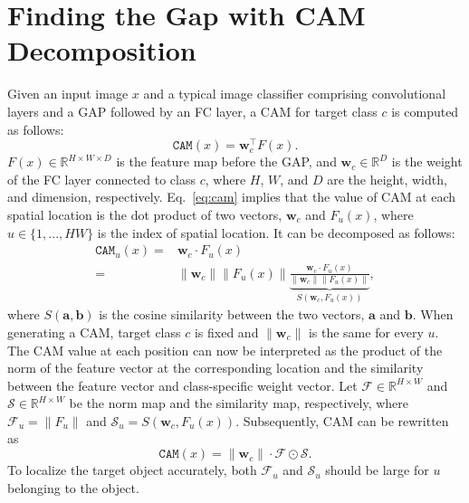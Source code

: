\section{Finding the Gap with CAM Decomposition}
Given an input image $x$ and a typical image classifier comprising convolutional layers and a GAP followed by an FC layer, a CAM for target class $c$ is computed as follows:
\begin{equation}\label{eq:cam}
\texttt{CAM}(x) = \mathbf{w}^\intercal_c F(x).
\end{equation}
$F(x)\in\mathbb{R}^{H \times W \times D}$ is the feature map before the GAP, and $\mathbf{w}_c\in\mathbb{R}^{D}$ is the weight of the FC layer connected to class $c$, where $H$, $W$, and $D$ are the height, width, and dimension, respectively.
Eq.~\ref{eq:cam} implies that the value of CAM at each spatial location is the dot product of two vectors, $\mathbf{w}_c$ and $F_u(x)$, where $u\in\{1, ..., HW\}$ is the index of spatial location.
It can be decomposed as follows:
\begin{equation}\label{eq:cam_each}
\begin{aligned}
\texttt{CAM}_u(x) = & \mathbf{w}_c \cdot F_u(x) \\
= & \|\mathbf{w}_c\|\|F_u(x)\| \underbrace{\frac{\mathbf{w}_c \cdot F_u(x)}{\|\mathbf{w}_c\|\|F_u(x)\|}}_{\textstyle S(\mathbf{w}_c,F_u(x))},
\end{aligned}
\end{equation}
where $S(\mathbf{a},\mathbf{b})$ is the cosine similarity between the two vectors, $\mathbf{a}$ and $\mathbf{b}$.
When generating a CAM, target class $c$ is fixed and $\|\mathbf{w}_c\|$ is the same for every $u$.
The CAM value at each position can now be interpreted as the product of the norm of the feature vector at the corresponding location and the similarity between the feature vector and class-specific weight vector.
Let $\mathcal{F}\in\mathbb{R}^{H \times W}$ and $\mathcal{S}\in\mathbb{R}^{H \times W}$ be the norm map and the similarity map, respectively, where $\mathcal{F}_u=\|F_u\|$ and $\mathcal{S}_u=S(\mathbf{w}_c, F_u(x))$. Subsequently, CAM can be rewritten as
\begin{equation}\label{eq:cam_abb}
\texttt{CAM}(x) = \|\mathbf{w}_c\|\cdot\mathcal{F}\odot\mathcal{S}.
\end{equation}
To localize the target object accurately, both $\mathcal{F}_u$ and $\mathcal{S}_u$ should be large for $u$ belonging to the object.

